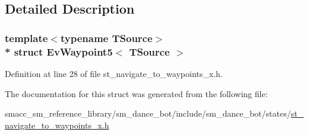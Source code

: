 \subsection{Detailed Description}
\subsubsection*{template$<$typename T\+Source$>$\\*
struct Ev\+Waypoint5$<$ T\+Source $>$}



Definition at line 28 of file st\+\_\+navigate\+\_\+to\+\_\+waypoints\+\_\+x.\+h.



The documentation for this struct was generated from the following file\+:\begin{DoxyCompactItemize}
\item 
smacc\+\_\+sm\+\_\+reference\+\_\+library/sm\+\_\+dance\+\_\+bot/include/sm\+\_\+dance\+\_\+bot/states/\hyperlink{st__navigate__to__waypoints__x_8h}{st\+\_\+navigate\+\_\+to\+\_\+waypoints\+\_\+x.\+h}\end{DoxyCompactItemize}
